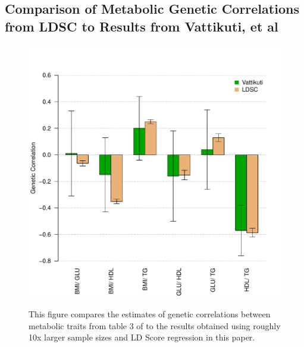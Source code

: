 \documentclass[11pt]{article}
\numberwithin{equation}{section}
\numberwithin{definition}{section}
\numberwithin{thm}{section}
\numberwithin{lemma}{section}
\numberwithin{prop}{section}
\numberwithin{cor}{section}
\numberwithin{hyp}{section}
\begin{document}
\subsection{Comparison of Metabolic Genetic Correlations from LDSC to Results from Vattikuti, et al}
\begin{figure}[!ht]

\begin{centering}
    \includegraphics[scale=0.8]{figs/vattikuti.pdf}
         \label{vattikuti}

This figure compares the estimates of genetic correlations between metabolic traits from table 3 of \cite{vattikuti2012heritability}
to the results obtained using roughly 10x larger sample sizes and LD Score regression in this paper.
\end{centering}
\end{figure}
\newpage
\end{document}
